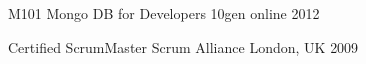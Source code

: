 


\begin{cvhonors}


\cvhonor
{M101 Mongo DB for Developers} %
{10gen} %
{online} %
{2012} %


\cvhonor
{Certified ScrumMaster} %
{Scrum Alliance} %
{London, UK} %
{2009} %


\end{cvhonors}
